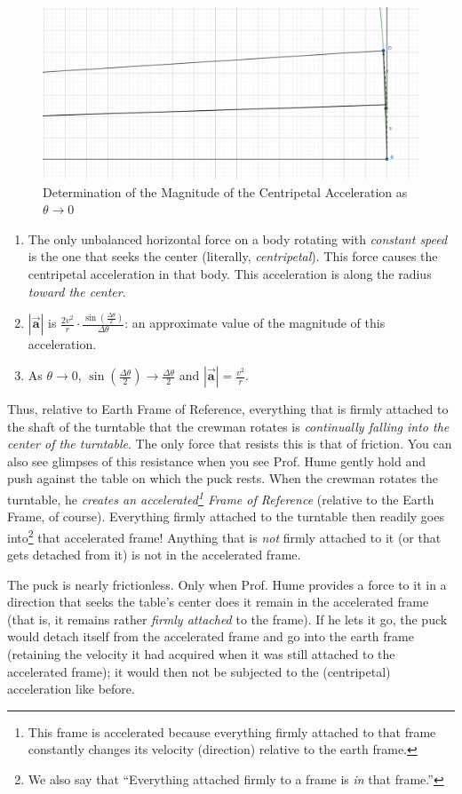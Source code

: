\documentclass[a6paper]{article}
\newcommand{\vect}[1]{\pmb{\vec{#1}}}
\begin{document}
{        \begin{figure}[h!]
            \centering
            \includegraphics[width=0.5\linewidth]{centripetal-acceleration-limiting-case.png}
            \caption{Determination of the Magnitude of the Centripetal Acceleration as $\theta \rightarrow 0$}
            \label{fig: centripetal-acceleration-limiting-case}
        \end{figure}
    \begin{enumerate}
        \item The only unbalanced horizontal force on a body rotating with \emph{constant speed} is the one that seeks the center (literally, \emph{centripetal}). This force causes the centripetal acceleration in that body. This acceleration is along the radius \emph{toward the center}.
        \item $|\vect{a}|$ is $\frac {2v^2}{r}\cdot\frac{\sin({\frac{\Delta\theta}{2}})}{\Delta\theta}$: an approximate value of the magnitude of this acceleration.
        \item As $\theta \to 0$, $\sin(\frac{\Delta\theta}{2})\to\frac{\Delta\theta}{2}$ and $|\vect{a}|=\frac{v^2}{r}$.
    \end{enumerate}

Thus, relative to Earth Frame of Reference, everything that is firmly attached to the shaft of the turntable that the crewman rotates is \emph{continually falling into the center of the turntable}. The only force that resists this is that of friction. You can also see glimpses of this resistance when you see Prof. Hume gently hold and push {against} the table on which the puck rests. When the crewman rotates the turntable, he \emph{creates an accelerated\footnote{This frame is accelerated because everything firmly attached to that frame constantly changes its velocity (direction) relative to the earth frame.} Frame of Reference} (relative to the Earth Frame, of course). Everything firmly attached to the turntable then readily goes into\footnote{We also say that ``Everything attached firmly to a frame is \emph{in} that frame.''} that accelerated frame! Anything that is \emph{not} firmly attached to it (or that gets detached from it) is not in the accelerated frame. 

The puck is nearly frictionless. Only when Prof. Hume provides a force to it in a direction that seeks the table's center does it remain in the accelerated frame (that is, it remains rather \emph{firmly attached} to the frame). If he lets it go, the puck would detach itself from the accelerated frame and go into the earth frame (retaining the velocity it had acquired when it was still attached to the accelerated frame); it would then not be subjected to the (centripetal) acceleration like before.
}
\end{document}
